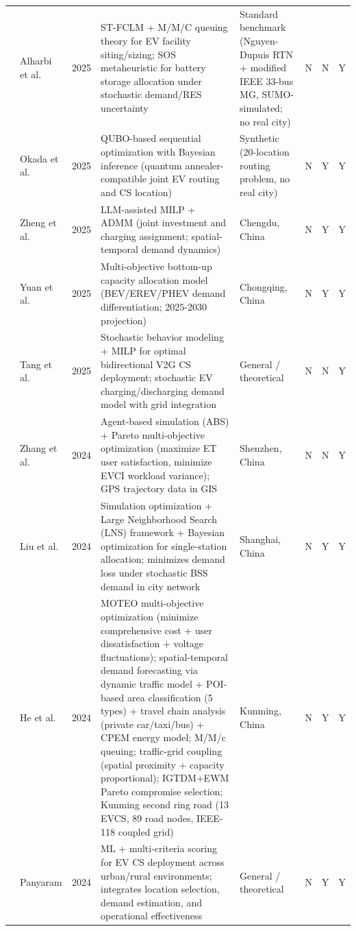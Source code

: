 \documentclass[letterpaper, 12pt, oneside, doublespacing]{Thesis}
\begin{document}
\begin{longtable}{L{0.9cm} L{1.8cm} L{0.7cm} L{2.5cm} L{2.1cm} L{0.7cm} L{0.7cm} L{0.7cm}}
\cite{data-driven_ev_2025} & Alharbi et al. & 2025 & ST-FCLM + M/M/C queuing theory for EV facility siting/sizing; SOS metaheuristic for battery storage allocation under stochastic demand/RES uncertainty & Standard benchmark (Nguyen-Dupuis RTN + modified IEEE 33-bus MG, SUMO-simulated; no real city) & N & N & Y \\
\cite{joint_optimization_2025} & Okada et al. & 2025 & QUBO-based sequential optimization with Bayesian inference (quantum annealer-compatible joint EV routing and CS location) & Synthetic (20-location routing problem, no real city) & N & Y & Y \\
\cite{large_language_2025} & Zheng et al. & 2025 & LLM-assisted MILP + ADMM (joint investment and charging assignment; spatial-temporal demand dynamics) & Chengdu, China & N & Y & Y \\
\cite{planning_future_2025} & Yuan et al. & 2025 & Multi-objective bottom-up capacity allocation model (BEV/EREV/PHEV demand differentiation; 2025-2030 projection) & Chongqing, China & N & Y & Y \\
\cite{stochastic_behavior_2025} & Tang et al. & 2025 & Stochastic behavior modeling + MILP for optimal bidirectional V2G CS deployment; stochastic EV charging/discharging demand model with grid integration & General {\slash} theoretical & N & N & Y \\
\cite{a_data-driven_2024} & Zhang et al. & 2024 & Agent-based simulation (ABS) + Pareto multi-objective optimization (maximize ET user satisfaction, minimize EVCI workload variance); GPS trajectory data in GIS & Shenzhen, China & N & N & Y \\
\cite{battery_swapping_2024} & Liu et al. & 2024 & Simulation optimization + Large Neighborhood Search (LNS) framework + Bayesian optimization for single-station allocation; minimizes demand loss under stochastic BSS demand in city network & Shanghai, China & N & Y & Y \\
\cite{optimal_evcs_2024} & He et al. & 2024 & MOTEO multi-objective optimization (minimize comprehensive cost + user dissatisfaction + voltage fluctuations); spatial-temporal demand forecasting via dynamic traffic model + POI-based area classification (5 types) + travel chain analysis (private car/taxi/bus) + CPEM energy model; M/M/c queuing; traffic-grid coupling (spatial proximity + capacity proportional); IGTDM+EWM Pareto compromise selection; Kunming second ring road (13 EVCS, 89 road nodes, IEEE-118 coupled grid) & Kunming, China & N & Y & Y \\
\cite{optimization_strategies_2024} & Panyaram & 2024 & ML + multi-criteria scoring for EV CS deployment across urban/rural environments; integrates location selection, demand estimation, and operational effectiveness & General {\slash} theoretical & N & Y & Y \\

\end{longtable}
\end{document}
